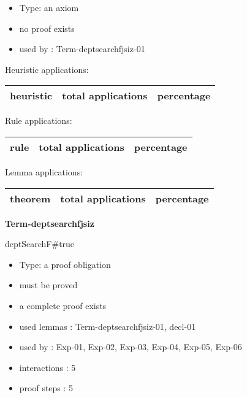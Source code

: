 \documentclass[a4paper]{article}
\begin{document}
\begin{itemize}

\item Type: an axiom

\item       no proof exists
\item       used by      : Term-deptsearchfjsiz-01
\end{itemize}

\medskip


Heuristic applications:

\begin{supertabular}{l|r|r}
heuristic	& total applications & percentage \\ \hline

\end{supertabular}

Rule applications:

\begin{supertabular}{l|r|r}
rule	        & total applications & percentage \\ \hline

\end{supertabular}

Lemma applications:

\begin{supertabular}{l|r|r}
theorem	        & total applications & percentage \\ \hline

\end{supertabular}
\pagebreak

{\LARGE\bf Term-deptsearchfjsiz}\label{lemma-Term-deptsearchfjsiz}

\medskip

 \Fol \Do deptSearchF\#\Dc true

\begin{itemize}

\item Type: a proof obligation

\item       must be proved
\item       a complete proof exists
\item       used lemmas  : Term-deptsearchfjsiz-01, decl-01
\item       used by      : Exp-01, Exp-02, Exp-03, Exp-04, Exp-05, Exp-06
\item       interactions : 5
\item       proof steps  : 5
\end{itemize}
\end{document}

